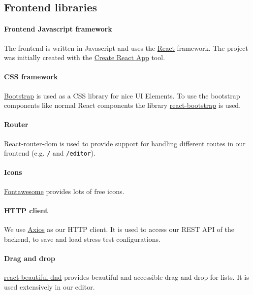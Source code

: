 \subsection{Frontend libraries}

\paragraph{Frontend Javascript framework}
The frontend is written in Javascript and uses the \href{https://reactjs.org}{React} framework.
The project was initially created with the \href{https://create-react-app.dev}{Create React App} tool.

\paragraph{CSS framework}
\href{https://getbootstrap.com}{Bootstrap} is used as a CSS library for nice UI Elements. 
To use the bootstrap components like normal React components the library \href{https://react-bootstrap.github.io}{react-bootstrap} is used.

\paragraph{Router}
\href{https://reacttraining.com/react-router/web/guides/quick-start}{React-router-dom} is used to provide support for handling different routes in our frontend (e.g. \texttt{/} and \texttt{/editor}).

\paragraph{Icons}
\href{https://fontawesome.com}{Fontawesome} provides lots of free icons.

\paragraph{HTTP client}
We use \href{https://github.com/axios/axios}{Axios} as our HTTP client.
It is used to access our REST API of the backend, to save and load stress test configurations.

\paragraph{Drag and drop}
\href{https://github.com/atlassian/react-beautiful-dnd}{react-beautiful-dnd} provides beautiful and accessible drag and drop for lists.
It is used extensively in our editor.


